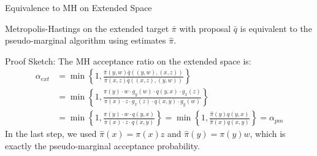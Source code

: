 \begin{frame}{Equivalence to MH on Extended Space}
	\begin{theorem}[Equivalence]
		Metropolis-Hastings on the extended target $\bar{\pi}$ with proposal $\bar{q}$ is equivalent to the pseudo-marginal algorithm using estimates $\hat{\pi}$.
	\end{theorem}

	Proof Sketch:
	The MH acceptance ratio on the extended space is:
	\begin{align*}
		\alpha_{ext} & = \min\left\{1, \frac{\bar{\pi}(y,w)\bar{q}((y,w),(x,z))}{\bar{\pi}(x,z)\bar{q}((x,z),(y,w))}\right\}                                       \\
		             & = \min\left\{1, \frac{\pi(y) \cdot w \cdot g_y(w) \cdot q(y,x) \cdot g_x(z)}{\pi(x) \cdot z \cdot g_x(z) \cdot q(x,y) \cdot g_y(w)}\right\} \\
		             & = \min\left\{1, \frac{\pi(y) \cdot w \cdot q(y,x)}{\pi(x) \cdot z \cdot q(x,y)}\right\}
		= \min\left\{1, \frac{\hat{\pi}(y)q(y,x)}{\hat{\pi}(x)q(x,y)}\right\} = \alpha_{pm}
	\end{align*}
	In the last step, we used $\hat{\pi}(x) = \pi(x) z$ and $\hat{\pi}(y) = \pi(y) w$,
	which is exactly the pseudo-marginal acceptance probability.
\end{frame}

